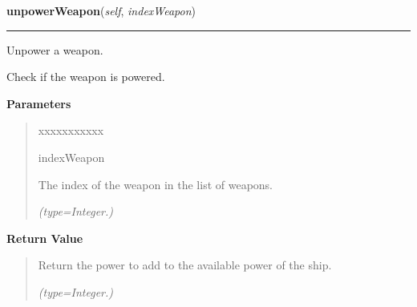 \hspace{.8\funcindent}\begin{boxedminipage}{\funcwidth}

    \raggedright \textbf{unpowerWeapon}(\textit{self}, \textit{indexWeapon})

    \vspace{-1.5ex}

    \rule{\textwidth}{0.5\fboxrule}
\setlength{\parskip}{2ex}
    Unpower a weapon.

    Check if the weapon is powered.

\setlength{\parskip}{1ex}
      \textbf{Parameters}
      \vspace{-1ex}

      \begin{quote}
        \begin{Ventry}{xxxxxxxxxxx}

          \item[indexWeapon]

          The index of the weapon in the list of weapons.

            {\it (type=Integer.)}

        \end{Ventry}

      \end{quote}

      \textbf{Return Value}
    \vspace{-1ex}

      \begin{quote}
      Return the power to add to the available power of the ship.

      {\it (type=Integer.)}

      \end{quote}

    \end{boxedminipage}

    \label{systems:WeaponControl:cooldownWeapons}

    \vspace{0.5ex}

